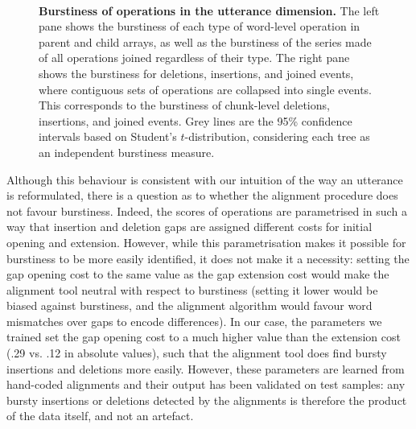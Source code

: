 \begin{figure}[!ht]
  \centering
  ~
  \caption[Burstiness of operations in the utterance dimension]{
  \textbf{Burstiness of operations in the utterance dimension.}
  The left pane shows the burstiness of each type of word-level operation in parent and child arrays, as well as the burstiness of the series made of all operations joined regardless of their type.
  The right pane shows the burstiness for deletions, insertions, and joined events, where contiguous sets of operations are collapsed into single events.
  This corresponds to the burstiness of chunk-level deletions, insertions, and joined events.
  Grey lines are the 95\% confidence intervals based on Student's $t$-distribution, considering each tree as an independent burstiness measure.
  }
  \label{fig:gistr-utterance-burstiness}
\end{figure}

Although this behaviour is consistent with our intuition of the way an
utterance is reformulated, there is a question as to whether the
alignment procedure does not favour burstiness. Indeed, the scores of
operations are parametrised in such a way that insertion and deletion
gaps are assigned different costs for initial opening and extension.
However, while this parametrisation makes it possible for burstiness to
be more easily identified, it does not make it a necessity: setting the
gap opening cost to the same value as the gap extension cost would make
the alignment tool neutral with respect to burstiness (setting it lower
would be biased against burstiness, and the alignment algorithm would
favour word mismatches over gaps to encode differences). In our case,
the parameters we trained set the gap opening cost to a much higher
value than the extension cost (.29 vs. .12 in absolute values), such
that the alignment tool does find bursty insertions and deletions more
easily. However, these parameters are learned from hand-coded alignments
and their output has been validated on test samples: any bursty
insertions or deletions detected by the alignments is therefore the
product of the data itself, and not an artefact.

